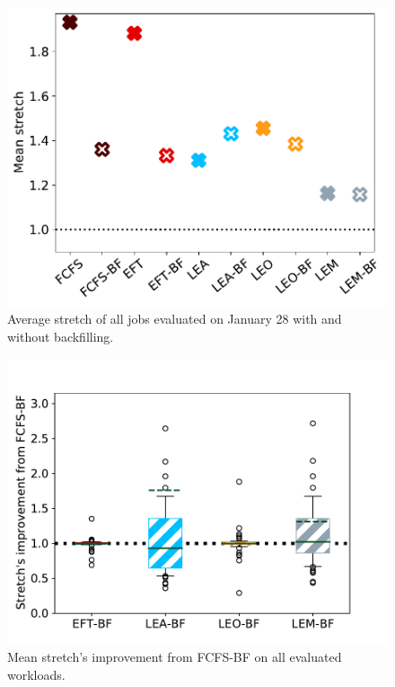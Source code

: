 \documentclass[conference,10pt]{IEEEtran}
\begin{document}
\begin{figure}[t]\centering\includegraphics[width=1\linewidth]{../MBSS/plot/BF_AND_NON_BF_Results_FCFS_Score_Backfill_2022-01-28->2022-01-28_V10000_Mean_Stretch_450_128_32_256_4_1024.pdf}\caption{Average stretch of all jobs evaluated on January 28 with and without backfilling.}\label{stretch.01-28}\end{figure}
\begin{figure}[t]\centering\includegraphics[width=1\linewidth]{../MBSS/plot/Boxplot/box_plot_mean_stretch_all_workloads_bf.pdf}\caption{Mean stretch's improvement from FCFS-BF on all evaluated workloads.}\label{boxplot.all_bf}\end{figure}
\end{document}
